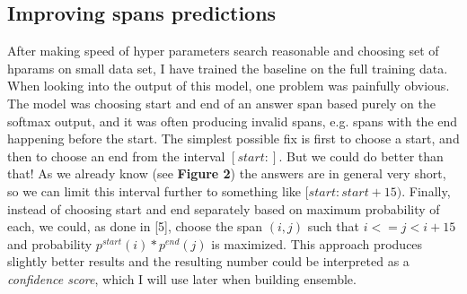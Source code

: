 \documentclass{article}
\begin{document}
\subsection{Improving spans predictions}
After making speed of hyper parameters search reasonable and choosing set of hparams on small data set, I have trained the baseline on the full training data. When looking into the output of this model, one problem was painfully obvious. The model was choosing start and end of an answer span based purely on the softmax output, and it was often producing invalid spans, e.g. spans with the end happening before the start. The simplest possible fix is first to choose a start, and then to choose an end from the interval $[start:]$. But we could do better than that! As we already know (see {\bf Figure 2}) the answers are in general very short, so we can limit this interval further to something like $[start: start + 15)$. Finally, instead of choosing start and end separately based on maximum probability of each, we could, as done in [5], choose the span $(i, j)$ such that $i <= j < i + 15$ and probability $p^{start}(i)*p^{end}(j)$ is maximized. This approach produces slightly better results and the resulting number could be interpreted as a {\it confidence score}, which I will use later when building ensemble.
\end{document}
